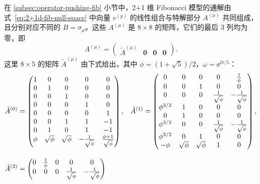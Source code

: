 在 \ref{subsec:operator-pushing-fib} 小节中，2+1 维 Fibonacci 模型的通解由式~\eqref{eq:2+1d-fib-null-space} 中向量 $v^{(p)}$ 的线性组合与特解部分 $A^{(\mu)}$ 共同组成，且分别对应不同的 $B=\sigma_\mu$。这些 $A^{(\mu)}$ 是 $8\times8$ 的矩阵，它们的最后 3 列均为零，即
\begin{equation}
  A^{(\mu)} = \begin{pmatrix}
    \tilde{A}^{(\mu)} & \mathbf{0} & \mathbf{0} & \mathbf{0}
  \end{pmatrix}.
  \label{eq:2+1d-fib-solution-1}
\end{equation}
这里 $8\times5$ 的矩阵 $\tilde{A}^{(\mu)}$ 由下式给出，其中 $\phi=(1+\sqrt5)/2$，$\omega=\ee^{\ii\pi/5}$：
\begingroup
\small
\allowdisplaybreaks
\begin{align}
  \tilde{A}^{(0)} &= \begin{pmatrix}
    1 & 0 & 0 & 0 & 0 \\
    0 & 1 & 0 & 0 & 0 \\
    0 & 0 & 1 & 0 & 0 \\
    0 & 0 & 0 & 1 & 0 \\
    0 & 0 & 0 & 0 & 1 \\
    0 & 0 & 1 & 1 & -1 \\
    0 & 1 & 0 & 1 & -1 \\
    \phi & \sqrt{\phi} & \sqrt{\phi} & -\frac{1}{\sqrt{\phi}} & \frac{\phi+1}{\sqrt{\phi}} \\
  \end{pmatrix}, &
  \tilde{A}^{(1)} &= \begin{pmatrix}
    0 & 0 & 0 & 0 & \frac{1}{\phi} \\
    0 & 0 & 1 & 0 & 0 \\
    0 & 0 & 0 & \frac{1}{\sqrt{\phi}} & -\frac{1}{\sqrt{\phi}} \\
    \phi^{3/2} & 1 & 0 & 0 & 0 \\
    0 & 1 & 0 & 0 & 0 \\
    \phi^{3/2} & 0 & 0 & \frac{1}{\sqrt{\phi}} & -\frac{1}{\sqrt{\phi}} \\
    \phi^{3/2} & 0 & 1 & 0 & 0 \\
    -\phi & \sqrt{\phi} & \sqrt{\phi} & 1 & 0 \\
  \end{pmatrix}, \notag \\[2ex]
  \tilde{A}^{(2)} &= \begin{pmatrix}
    0 & \frac{1}{\phi} & 0 & 0 & 0 \\
    0 & 0 & 0 & \frac{1}{\sqrt{\phi}} & -\frac{1}{\sqrt{\phi}} \\

\end{pmatrix}
\end{align}
